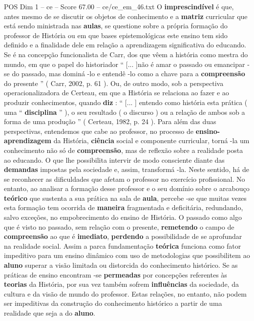 \begin{textsample}{POS Dim 1 – ce – Score 67.00 – ce/ce\_em\_46.txt}
O \textbf{imprescindível} é que, antes mesmo de se discutir os objetos de conhecimento e a \textbf{matriz} curricular que está sendo ministrada nas \textbf{aulas}, se questione sobre a própria formação do professor de História ou em que bases epistemológicas este ensino tem sido definido e a finalidade dele em relação a aprendizagem significativa do educando.
Se é na concepção funcionalista de Carr, dos que vêem a história como mestra do mundo, em que o papel do historiador “ [... ]não é amar o passado ou emancipar -se do passado, mas dominá -lo e entendê -lo como a chave para a \textbf{compreensão} do presente ” ( Carr, 2002, p. 61 ).
Ou, de outro modo, sob a perspectiva operacionalizadora de Certeau, em que a História se relaciona ao fazer e ao produzir conhecimentos, quando \textbf{diz} : “ [... ] entendo como história esta prática ( uma “ \textbf{disciplina} ” ), o seu resultado ( o discurso ) ou a relação de ambos sob a forma de uma produção ” ( Certeau, 1982, p. 24 ).
Para além das duas perspectivas, entendemos que cabe ao professor, no processo de \textbf{ensino-aprendizagem} da História, \textbf{ciência} social e componente curricular, torná -la um conhecimento não só de \textbf{compreensão}, mas de reflexão sobre a realidade posta ao educando.
O que lhe possibilita intervir de modo consciente diante das \textbf{demandas} impostas pela sociedade e, assim, transformá -la.
Neste sentido, há de se reconhecer as dificuldades que afetam o professor no exercício profissional.
No entanto, ao analisar a formação desse professor e o seu domínio sobre o arcabouço \textbf{teórico} que sustenta a sua prática na sala de \textbf{aula}, percebe -se que muitas vezes esta formação tem ocorrida de \textbf{maneira} fragmentada e deficitária, redundando, salvo exceções, no empobrecimento do ensino de História.
O passado como algo que é visto no passado, sem relação com o presente, \textbf{remetendo} o campo de \textbf{compreensão} ao que é \textbf{imediato}, \textbf{perdendo} a possibilidade de se aprofundar na realidade social.
Assim a parca fundamentação \textbf{teórica} funciona como fator impeditivo para um ensino dinâmico com uso de metodologias que possibilitem ao \textbf{aluno} superar a visão limitada ou distorcida do conhecimento histórico.
Se as práticas de ensino encontram -se \textbf{permeadas} por concepções referentes às \textbf{teorias} da História, por sua vez também sofrem \textbf{influências} da sociedade, da cultura e da visão de mundo do professor.
Estas relações, no entanto, não podem ser impeditivas da construção do conhecimento histórico a partir de uma realidade que seja a do \textbf{aluno}.

\end{textsample}

